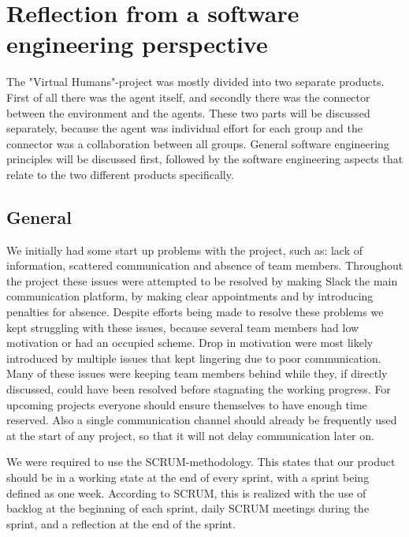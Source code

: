 \chapter[Reflection from a software engineering perspective]{Reflection from a software \\ engineering perspective}
\label{chap:Reflection from a software engineering perspective}

The "Virtual Humans"-project was mostly divided into two separate products.
First of all there was the agent itself, and secondly there was the connector between the environment and the agents.
These two parts will be discussed separately, because the agent was individual effort for each group and the connector was a collaboration between all groups. General software engineering principles will be discussed first,
followed by the software engineering aspects that relate to the two different products specifically.

\section{General}
\label{sec:General}

We initially had some start up problems with the project, such as: lack of information, scattered communication and absence of team members. Throughout the project these issues were attempted to be resolved by making Slack the main communication platform, by making clear appointments and by introducing penalties for absence. Despite efforts being made to resolve these problems we kept struggling with these issues, because several team members had low motivation or had an occupied scheme. Drop in motivation were most likely introduced by multiple issues that kept lingering due to poor communication. Many of these issues were keeping team members behind while they, if directly discussed, could have been resolved before stagnating the working progress. 
For upcoming projects everyone should ensure themselves to have enough time reserved. Also a single communication channel should already be frequently used at the start of any project, so that it will not delay communication later on. 

We were required to use the SCRUM-methodology. This states that our product should be in a working state at the end of every sprint, with a sprint being defined as one week.
According to SCRUM, this is realized with the use of backlog at the beginning of each sprint, daily SCRUM meetings during the sprint, and a reflection at the end of the sprint.

